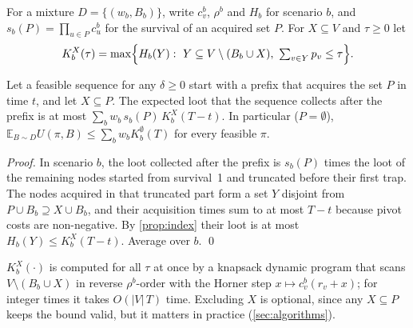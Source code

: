 \documentclass[runningheads]{llncs}
\newcommand{\Exp}{\mathbb{E}}
\begin{document}
For a mixture $D=\{(w_b,B_b)\}$, write $c_v^b$, $\rho^b$ and $H_b$ for scenario $b$, and $s_b(P)=\prod_{u\in P}c_u^b$ for the survival of an acquired set $P$. For $X\subseteq V$ and $\tau\ge0$ let
\[
K_b^X(\tau)=\max\Bigl\{H_b(Y):\ Y\subseteq V\setminus(B_b\cup X),\ \textstyle\sum_{v\in Y}p_v\le\tau\Bigr\}.
\]

\begin{lemma}\label{lem:bound}
Let a feasible sequence for any $\delta\ge0$ start with a prefix that acquires the set $P$ in time $t$, and let $X\subseteq P$. The expected loot that the sequence collects after the prefix is at most $\sum_b w_b\,s_b(P)\,K_b^X(T-t)$. In particular ($P=\emptyset$), $\Exp_{B\sim D}U(\pi,B)\le\sum_b w_bK_b^{\emptyset}(T)$ for every feasible $\pi$.
\end{lemma}
\begin{proof}
In scenario $b$, the loot collected after the prefix is $s_b(P)$ times the loot of the remaining nodes started from survival~1 and truncated before their first trap. The nodes acquired in that truncated part form a set $Y$ disjoint from $P\cup B_b\supseteq X\cup B_b$, and their acquisition times sum to at most $T-t$ because pivot costs are non-negative. By \cref{prop:index} their loot is at most $H_b(Y)\le K_b^X(T-t)$. Average over $b$. \qed
\end{proof}

$K_b^X(\cdot)$ is computed for all $\tau$ at once by a knapsack dynamic program that scans $V\setminus(B_b\cup X)$ in reverse $\rho^b$-order with the Horner step $x\mapsto c_v^b(r_v+x)$; for integer times it takes $O(|V|\,T)$ time. Excluding $X$ is optional, since any $X\subseteq P$ keeps the bound valid, but it matters in practice (\cref{sec:algorithms}).
\end{document}
